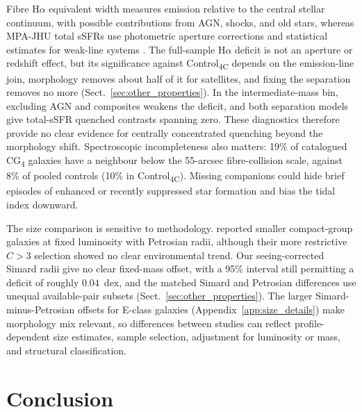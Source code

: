 \documentclass{aa}
\newcommand{\CC}{Control\textsubscript{4C}}
\newcommand{\CG}{CG\textsubscript{4}}
\begin{document}
Fibre H\(\alpha\) equivalent width measures emission relative to the central stellar continuum, with possible contributions from AGN, shocks, and old stars, whereas MPA-JHU total sSFRs use photometric aperture corrections and statistical estimates for weak-line systems \citep{Brinchmann+04,Salim+07}. The full-sample H\(\alpha\) deficit is not an aperture or redshift effect, but its significance against \CC{} depends on the emission-line join, morphology removes about half of it for satellites, and fixing the separation removes no more (Sect.~\ref{sec:other_properties}). In the intermediate-mass bin, excluding AGN and composites weakens the deficit, and both separation models give total-sSFR quenched contrasts spanning zero. These diagnostics therefore provide no clear evidence for centrally concentrated quenching beyond the morphology shift. Spectroscopic incompleteness also matters: 19\% of catalogued \CG{} galaxies have a neighbour below the 55-arcsec fibre-collision scale, against 8\% of pooled controls (10\% in \CC{}). Missing companions could hide brief episodes of enhanced or recently suppressed star formation and bias the tidal index downward.





The size comparison is sensitive to methodology. \citet{Coenda+12} reported smaller compact-group galaxies at fixed luminosity with Petrosian radii, although their more restrictive \(C>3\) selection showed no clear environmental trend. Our seeing-corrected Simard radii give no clear fixed-mass offset, with a 95\% interval still permitting a deficit of roughly \(0.04\)~dex, and the matched Simard and Petrosian differences use unequal available-pair subsets (Sect.~\ref{sec:other_properties}). The larger Simard-minus-Petrosian offsets for E-class galaxies (Appendix~\ref{app:size_details}) make morphology mix relevant, so differences between studies can reflect profile-dependent size estimates, sample selection, adjustment for luminosity or mass, and structural classification.


\section{Conclusion}\label{sec:conclusion}
\end{document}
